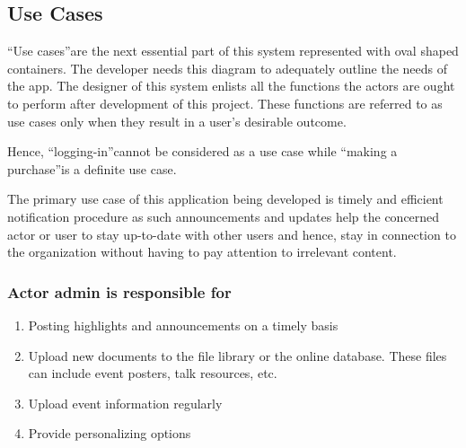 \subsection{Use Cases}
\textquotedblleft Use cases\textquotedblright are the next essential part of this system represented with oval shaped containers. The developer needs this diagram to adequately outline the needs of the app. The designer of this system enlists all the functions the actors are ought to perform after development of this project. These functions are referred to as use cases only when they result in a user\textquoteright s desirable outcome. \smallskip

 Hence, \textquotedblleft logging-in\textquotedblright cannot be considered as a use case while \textquotedblleft making a purchase\textquotedblright is a definite use case.\par \medskip

The primary use case of this application being developed is timely and efficient notification procedure as such announcements and updates help the concerned actor or user to stay up-to-date with other users and hence, stay in connection to the organization without having to pay attention to irrelevant content. \par


\subsubsection{Actor admin is responsible for}
\begin{enumerate}
    \item Posting highlights and announcements on a timely basis
    \item Upload new documents to the file library or the online database. These files can include event posters, talk resources, etc.
    \item Upload event information regularly
    \item Provide personalizing options 
\end{enumerate}
